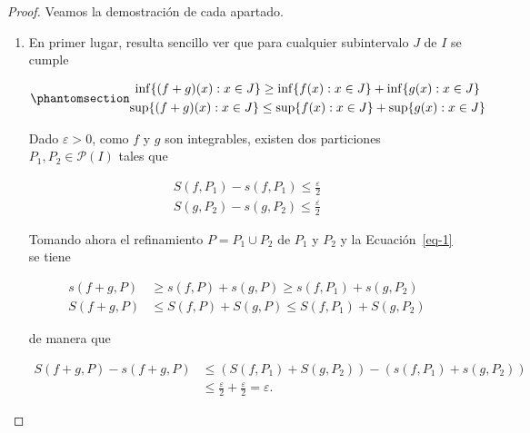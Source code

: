 \documentclass[
  a4paper,
]{scrreport}
\theoremstyle{definition}
\theoremstyle{plain}
\theoremstyle{definition}
\theoremstyle{definition}
\theoremstyle{plain}
\theoremstyle{plain}
\theoremstyle{remark}
\begin{document}
\begin{tcolorbox}[enhanced jigsaw, leftrule=.75mm, colbacktitle=quarto-callout-note-color!10!white, toprule=.15mm, opacityback=0, opacitybacktitle=0.6, toptitle=1mm, breakable, bottomtitle=1mm, colframe=quarto-callout-note-color-frame, rightrule=.15mm, titlerule=0mm, title=\textcolor{quarto-callout-note-color}{\faInfo}\hspace{0.5em}{Demostración}, arc=.35mm, left=2mm, bottomrule=.15mm, colback=white, coltitle=black]

\begin{proof}
Veamos la demostración de cada apartado.

\begin{enumerate}
\def\labelenumi{\alph{enumi}.}
\item
  En primer lugar, resulta sencillo ver que para cualquier subintervalo
  \(J\) de \(I\) se cumple

  \begin{equation}\phantomsection\label{eq-1}{
  \begin{gathered}
  \inf\{(f+g)(x): x\in J\} \geq \inf\{f(x): x\in J\} + \inf\{g(x): x\in J\}\\
  \sup\{(f+g)(x): x\in J\} \leq \sup\{f(x): x\in J\} + \sup\{g(x): x\in J\}
  \end{gathered}
  }\end{equation}

  Dado \(\varepsilon>0\), como \(f\) y \(g\) son integrables, existen
  dos particiones \(P_1,P_2\in \mathcal{P}(I)\) tales que

  \[
  \begin{gathered}
  S(f,P_1)-s(f,P_1)\leq \frac{\varepsilon}{2}\\
  S(g,P_2)-s(g,P_2)\leq \frac{\varepsilon}{2}
  \end{gathered}
  \]

  Tomando ahora el refinamiento \(P=P_1\cup P_2\) de \(P_1\) y \(P_2\) y
  la Ecuación~\ref{eq-1} se tiene

  \begin{align*}
  s(f+g,P) &\geq s(f,P) + s(g,P) \geq s(f,P_1) + s(g,P_2)\\
  S(f+g,P) &\leq S(f,P) + S(g,P) \leq S(f,P_1) + S(g,P_2)
  \end{align*}

  de manera que

  \begin{align*}
  S(f+g,P)-s(f+g,P) &\leq (S(f,P_1)+S(g,P_2))-(s(f,P_ 1)+s(g,P_2)) \\
  &\leq \frac{\varepsilon}{2}+\frac{\varepsilon}{2} =\varepsilon.
  \end{align*}


\end{enumerate}
\end{proof}
\end{tcolorbox}
\end{document}
